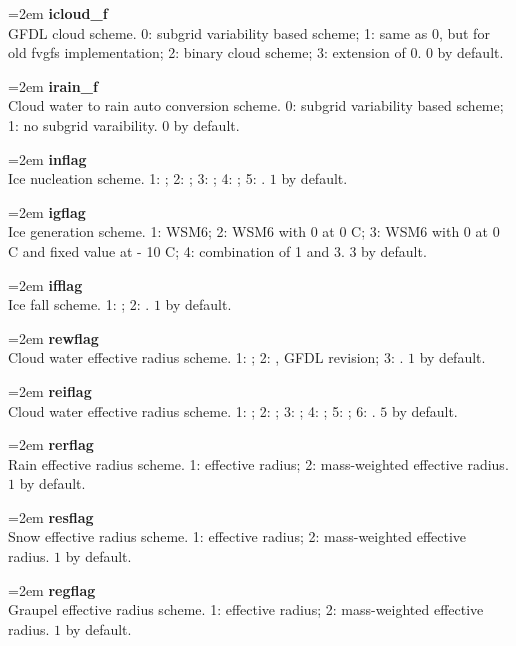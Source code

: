\documentclass[letterpaper,titlepage,10pt]{article}
\numberwithin{equation}{section}
\begin{document}
\begin{appendices}
\hangindent=2em
\textbf{icloud\_f}\\ GFDL cloud scheme. 0: subgrid variability based scheme; 1: same as 0, but for old fvgfs implementation; 2: binary cloud scheme; 3: extension of  0. $0$ by default.

\hangindent=2em
\textbf{irain\_f}\\ Cloud water to rain auto conversion scheme. 0: subgrid variability based scheme; 1: no subgrid varaibility. $0$ by default.

\hangindent=2em
\textbf{inflag}\\ Ice nucleation scheme. 1: \citet{hong2004arev}; 2: \citet{meyers1992newp}; 3: \citet{meyers1992newp}; 4: \citet{cooper1986icei}; 5: \citet{fletcher1962thep}. $1$ by default.

\hangindent=2em
\textbf{igflag}\\ Ice generation scheme. 1: WSM6; 2: WSM6 with 0 at 0 C; 3: WSM6 with 0 at 0 C and fixed value at - 10 C; 4: combination of 1 and 3. $3$ by default.

\hangindent=2em
\textbf{ifflag}\\ Ice fall scheme. 1: \citet{deng2008cirr}; 2: \citet{heymsfield1990asch}. $1$ by default.

\hangindent=2em
\textbf{rewflag}\\ Cloud water effective radius scheme. 1: \citet{martin1994them}; 2: \citet{martin1994them}, GFDL revision; 3: \citet{kiehl1994sens}. $1$ by default.

\hangindent=2em
\textbf{reiflag}\\ Cloud water effective radius scheme. 1: \citet{heymsfield1996high}; 2: \citet{donner1997larg}; 3: \citet{fu2007anew}; 4: \citet{kristjansson2000impa}; 5: \citet{wyser1998thee}; 6: \citet{sun1999para, sun2001repl}. $5$ by default.

\hangindent=2em
\textbf{rerflag}\\ Rain effective radius scheme. 1: effective radius; 2: mass-weighted effective radius. $1$ by default.

\hangindent=2em
\textbf{resflag}\\ Snow effective radius scheme. 1: effective radius; 2: mass-weighted effective radius. $1$ by default.

\hangindent=2em
\textbf{regflag}\\ Graupel effective radius scheme. 1: effective radius; 2: mass-weighted effective radius. $1$ by default.


\end{appendices}
\end{document}
